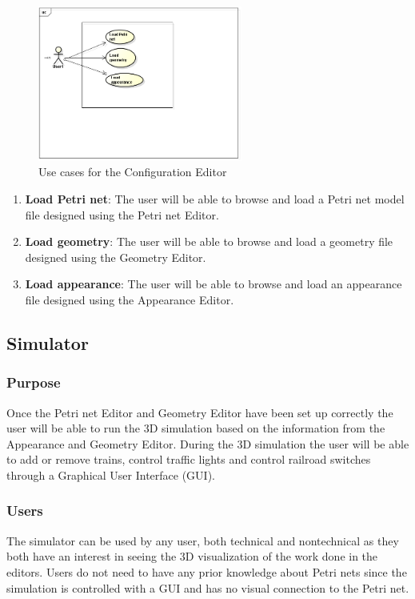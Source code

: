 \begin{figure}[htp]
\begin{center}
  \includegraphics[width=0.6\textwidth]{image/ConfigurationUC.png}
  \caption{Use cases for the Configuration Editor}
  \label{fig:configuration_editor_usecases}
\end{center}
\end{figure}

\begin{enumerate}
\item \textbf{Load Petri net}: The user will be able to browse and load a Petri net model file designed using the Petri net Editor.
\item \textbf{Load geometry}: The user will be able to browse and load a geometry file designed using the Geometry Editor.
\item \textbf{Load appearance}: The user will be able to browse and load an appearance file designed using the Appearance Editor.
\end{enumerate}

\subsection{Simulator}
\subsubsection{Purpose}
Once the Petri net Editor and Geometry Editor have been set up correctly the user will be able to run the 3D simulation based on the information from the Appearance and Geometry Editor. During the 3D simulation the user will be able to add or remove trains, control traffic lights and control railroad switches through a Graphical User Interface (GUI).
\subsubsection{Users}
The simulator can be used by any user, both technical and nontechnical as they both have an interest in seeing the 3D visualization of the work done in the editors. Users do not need to have any prior knowledge about Petri nets since the simulation is controlled with a GUI and has no visual connection to the Petri net. 
